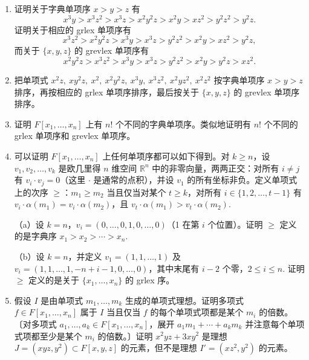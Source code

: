 \begin{enumerate}
（b）证明关于 \(\{x_1, x_2\}\) 的 grevlex 序在 \(F[x_1, x_2]\) 上就是 \(x_1 > x_2\) 的分级字典序，但关于 \(\{x_1, x_2, x_3\}\) 的 grevlex 序在 \(F[x_1, x_2, x_3]\) 上不是任何字典序的分级。

（c）证明关于 \(\{x_1, x_2, x_3\}\) 的 grevlex 单项序有
\[
x_1^2x_2 > x_1^2x_3 > x_1x_2x_3 > x_2^2x_3 > x_1x_3^2 > x_2x_3^2 > x_1^2 > x_1 > x_2 > x_3.
\]

\item 证明关于字典单项序 \(x > y > z\) 有
\[
x^3y > x^3z^2 > x^3z > x^2y^2z > x^2y > xz^2 > y^2z^2 > y^2z.
\]
证明关于相应的 grlex 单项序有
\[
x^3z^2 > x^2y^2z > x^3y > x^3z > y^2z^2 > x^2y > xz^2 > y^2z,
\]
而关于 \(\{x, y, z\}\) 的 grevlex 单项序有
\[
x^2y^2z > x^3z^2 > x^3y > x^3z > y^2z^2 > x^2y > y^2z > xz^2.
\]

\item 把单项式 \(x^2z,\ xy^2z,\ x^2,\ x^2y^2z,\ x^3y,\ x^3z^2,\ x^2yz^2,\ x^2z^2\) 按字典单项序 \(x > y > z\) 排序，再按相应的 grlex 单项序排序，最后按关于 \(\{x, y, z\}\) 的 grevlex 单项序排序。

\item 证明 \(F[x_1, \ldots, x_n]\) 上有 \(n!\) 个不同的字典单项序。类似地证明有 \(n!\) 个不同的 grlex 单项序和 grevlex 单项序。

\item 可以证明 \(F[x_1, \ldots, x_n]\) 上任何单项序都可以如下得到。对 \(k \geq n\)，设 \(v_1, v_2, \ldots, v_k\) 是欧几里得 \(n\) 维空间 \(\mathbb{R}^n\) 中的非零向量，两两正交：对所有 \(i \neq j\) 有 \(v_i \cdot v_j = 0\)（这里 \(\cdot\) 是通常的点积），并设 \(v_1\) 的所有坐标非负。定义单项式上的次序 \(\geq\)：\(m_1 \geq m_2\) 当且仅当对某个 \(t \geq k\)，对所有 \(i \in \{1, 2, \ldots, t-1\}\) 有 \(v_i \cdot \alpha(m_1) = v_i \cdot \alpha(m_2)\)，且 \(v_t \cdot \alpha(m_1) > v_t \cdot \alpha(m_2)\).

（a）设 \(k = n\)，\(v_i = (0, \ldots, 0, 1, 0, \ldots, 0)\)（1 在第 \(i\) 个位置）。证明 \(\geq\) 定义的是字典序 \(x_1 > x_2 > \cdots > x_n\).

（b）设 \(k = n\)，并定义 \(v_1 = (1, 1, \ldots, 1)\) 及 \(v_i = (1, 1, \ldots, 1, -n+i-1, 0, \ldots, 0)\)，其中末尾有 \(i-2\) 个零，\(2 \leq i \leq n\). 证明 \(\geq\) 定义的是关于 \(\{x_1, \ldots, x_n\}\) 的 grlex 序。

\item 假设 \(I\) 是由单项式 \(m_1, \ldots, m_k\) 生成的单项式理想。证明多项式 \(f \in F[x_1, \ldots, x_n]\) 属于 \(I\) 当且仅当 \(f\) 的每个单项式项都是某个 \(m_i\) 的倍数。〔对多项式 \(a_1, \ldots, a_k \in F[x_1, \ldots, x_n]\)，展开 \(a_1m_1+\cdots+a_km_k\) 并注意每个单项式项都至少是某个 \(m_i\) 的倍数。〕证明 \(x^2yz+3xy^2\) 是理想 \(J = (xyz, y^2) \subset F[x, y, z]\) 的元素，但不是理想 \(I' = (xz^2, y^2)\) 的元素。


\end{enumerate}
